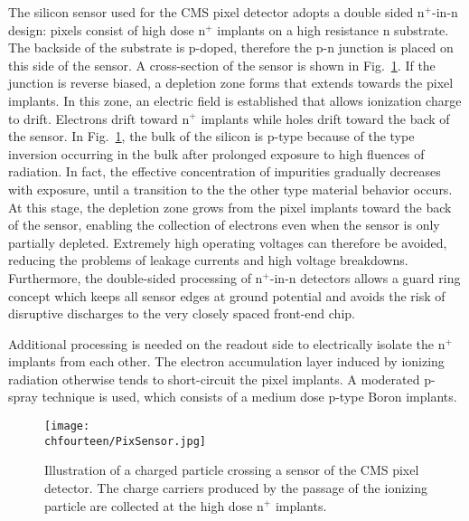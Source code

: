 The silicon sensor used for the CMS pixel detector adopts a double sided n$^+$-in-n design: pixels consist of high dose n$^+$ implants on a high resistance n substrate.
The backside of the substrate is p-doped, therefore the p-n junction is placed on this side of the sensor. A cross-section of the sensor is shown in Fig.~\ref{fig:PixSensor}.
If the junction is reverse biased, a depletion zone forms that extends towards the pixel implants. In this zone, an electric field is established that allows ionization charge to drift.
Electrons drift toward n$^+$ implants while holes drift toward the back of the sensor.
In Fig.~\ref{fig:PixSensor}, the bulk of the silicon is p-type because of the type inversion occurring in the bulk after prolonged exposure to high fluences of radiation.
In fact, the effective concentration of impurities gradually decreases with exposure, until a transition to the the other type material behavior occurs.
At this stage, the depletion zone grows from the pixel implants toward the back of the sensor, enabling the collection of electrons even when the sensor is only partially depleted.
Extremely high operating voltages can therefore be avoided, reducing the problems of leakage currents and high voltage breakdowns.
Furthermore, the double-sided processing of n$^+$-in-n detectors allows a guard ring concept which keeps all sensor edges at ground potential
and avoids the risk of disruptive discharges to the very closely spaced front-end chip.

Additional processing is needed on the readout side to electrically isolate the n$^+$ implants from each other.
The electron accumulation layer induced by ionizing radiation otherwise tends to short-circuit the pixel implants.
A moderated p-spray technique is used, which consists of a medium dose p-type Boron implants.\\

\begin{figure}[!htb]
 \begin{center}
 \texttt{[image: \\chfourteen/PixSensor.jpg]}
 \end{center}
 \caption{Illustration of a charged particle crossing a sensor of the CMS pixel detector. The charge carriers produced by the passage of the ionizing particle are collected at the high dose n$^+$ implants.}
 \label{fig:PixSensor}
\end{figure}


